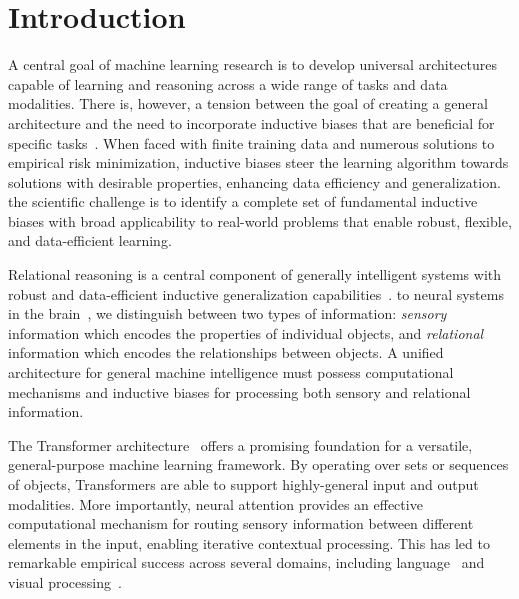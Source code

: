 \section{Introduction}\label{sec:intro}

A central goal of machine learning research is to develop universal architectures capable of learning and reasoning across a wide range of tasks and data modalities.
There is, however, a tension between the goal of creating a general architecture and the need to incorporate inductive biases that are beneficial for specific tasks~\citep{wolpert1995no,baxter2000model}. When faced with finite training data and numerous solutions to empirical risk minimization, inductive biases steer the learning algorithm towards solutions with desirable properties, enhancing data efficiency and generalization.
 the scientific challenge is to identify a complete set of fundamental inductive biases with broad applicability to real-world problems that enable robust, flexible, and data-efficient learning.

Relational reasoning is a central component of generally intelligent systems with robust and data-efficient inductive generalization capabilities~\citep{kemp2008discovery}.  to neural systems in the brain~\citep{newman1997neural}, we distinguish between two types of information: \textit{sensory} information which encodes the properties of individual objects, and \textit{relational} information which encodes the relationships between objects. A unified architecture for general machine intelligence must possess computational mechanisms and inductive biases for processing both sensory and relational information.

The Transformer architecture~\citep{vaswani2017attention} offers a promising foundation for a versatile, general-purpose machine learning framework. By operating over sets or sequences of objects, Transformers are able to support highly-general input and output modalities. More importantly, neural attention provides an effective computational mechanism for routing sensory information between different elements in the input, enabling iterative contextual processing. This has led to remarkable empirical success across several domains, including language~\citep{kaplan2020scalinglawsneurallanguage} and visual processing~\citep{dosovitskiyImageWorth16x162020}.

